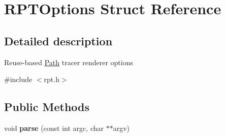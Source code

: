 \hypertarget{struct_r_p_t_options}{}\section{R\+P\+T\+Options Struct Reference}
\label{struct_r_p_t_options}


\subsection{Detailed description}
Reuse-\/based \hyperlink{struct_path}{Path} tracer renderer options 

{\ttfamily \#include $<$rpt.\+h$>$}

\subsection*{Public Methods}
\begin{DoxyCompactItemize}
\item 
\mbox{\label{struct_r_p_t_options_aa501f652a974d350ecc9676b223d79e7}} 
void {\bfseries parse} (const int argc, char $\ast$$\ast$argv)
\end{DoxyCompactItemize}
